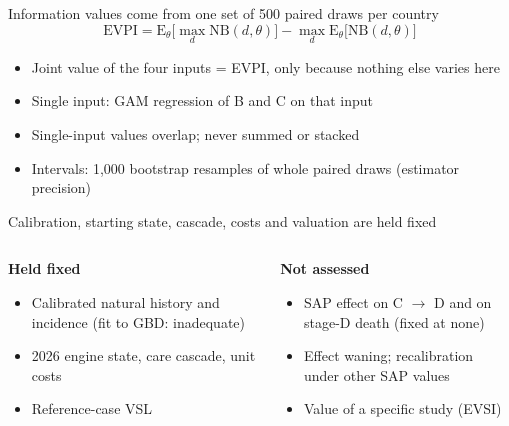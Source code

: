 \documentclass[
  ignorenonframetext,
  aspectratio=169]{beamer}
\providecommand{\tightlist}{%
  \setlength{\itemsep}{0pt}\setlength{\parskip}{0pt}}
\newcommand{\sourceline}[1]{\par\vspace{4pt}{\footnotesize\raggedright\textcolor{black!60}{#1}\par}}
\begin{document}
\begin{frame}{Information values come from one set of 500 paired draws
per country}
\label{information-values-come-from-one-set-of-500-paired-draws-per-country}
\[\mathrm{EVPI} = \mathrm{E}_\theta\big[\max_d \mathrm{NB}(d,\theta)\big] - \max_d \mathrm{E}_\theta\big[\mathrm{NB}(d,\theta)\big]\]

\begin{itemize}
\tightlist
\item
  Joint value of the four inputs = EVPI, only because nothing else
  varies here
\item
  Single input: GAM regression of B and C on that input
  \parencite{Strong2014}
\item
  Single-input values overlap; never summed or stacked
  \parencite{Rothery2020}
\item
  Intervals: 1,000 bootstrap resamples of whole paired draws (estimator
  precision)
\end{itemize}
\end{frame}

\begin{frame}{Calibration, starting state, cascade, costs and valuation
are held fixed}
\label{calibration-starting-state-cascade-costs-and-valuation-are-held-fixed}
\begin{columns}[T]
\begin{column}{0.48\linewidth}
\textbf{Held fixed}

\begin{itemize}
\tightlist
\item
  Calibrated natural history and incidence (fit to GBD: inadequate)
\item
  2026 engine state, care cascade, unit costs
\item
  Reference-case VSL \parencite{Robinson2019}
\end{itemize}
\end{column}

\begin{column}{0.48\linewidth}
\textbf{Not assessed}

\begin{itemize}
\tightlist
\item
  SAP effect on C \(\rightarrow\) D and on stage-D death (fixed at none)
\item
  Effect waning; recalibration under other SAP values
\item
  Value of a specific study (EVSI)
\end{itemize}
\end{column}
\end{columns}

\sourceline{Efficacy (M) is full-adherence efficacy; achieved adherence and coverage are separate, fixed cascade inputs. Calibration fit: inadequate (outside its GBD diagnostic tolerances) in both countries, so all results are preliminary.}
\end{frame}
\end{document}
